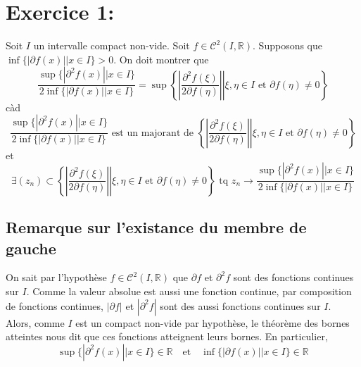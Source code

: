 \documentclass[a4paper, 12pt]{article}
\begin{document}
\newpage
\renewcommand{\contentsname}{Table des matières}
\tableofcontents

\newpage

\section{Exercice 1:}

Soit \( I \) un intervalle compact non-vide. Soit \( f \in \mathcal{C}^2(I, \mathbb{R}) \). Supposons que \( \inf\{|\partial f(x)| | x \in I\} > 0 \). On doit montrer que
$$
\frac{\sup \{ | \partial^2 f(x) || x \in I \}}{2 \inf \{ |\partial f(x)|| x \in I \}}
= \sup \left\{ \left. \left| \frac{\partial^2f(\xi)}{2\partial f(\eta)} \right| \right| \xi, \eta \in I \text{ et } \partial f(\eta) \neq 0 \right\}
$$
càd
\begin{equation}
    \label{eq:1.maj}
    \frac{\sup \{ | \partial^2 f(x) || x \in I \}}{2 \inf \{ |\partial f(x)|| x \in I \}} \text{ est un majorant de }
    \left\{ \left. \left| \frac{\partial^2f(\xi)}{2\partial f(\eta)} \right| \right| \xi, \eta \in I \text{ et } \partial f(\eta) \neq 0 \right\}
\end{equation}
et
\begin{equation}
    \label{eq:1.conv}
    \exists (z_n) \subset
    \left\{ \left. \left| \frac{\partial^2f(\xi)}{2\partial f(\eta)} \right| \right| \xi, \eta \in I \text{ et } \partial f(\eta) \neq 0 \right\}
    \text{ tq } z_n \to
    \frac{\sup \{ | \partial^2 f(x) || x \in I \}}{2 \inf \{ |\partial f(x)|| x \in I \}}
\end{equation}

\subsection{Remarque sur l'existance du membre de gauche}

On sait par l'hypothèse \( f \in \mathcal{C}^2(I, \mathbb{R}) \) que \( \partial f \) et \( \partial^2 f \) sont des fonctions continues sur \( I \). Comme la valeur absolue est aussi une fonction continue, par composition de fonctions continues, \( | \partial f | \) et \( | \partial^2 f | \) sont des aussi fonctions continues sur \( I \). \\
Alors, comme \( I \) est un compact non-vide par hypothèse, le théorème des bornes atteintes nous dit que ces fonctions atteignent leurs bornes. En particulier,
$$
\sup \{ | \partial^2 f(x) || x \in I \} \in \mathbb{R} \quad \text{et} \quad
\inf \{ |\partial f(x)|| x \in I \} \in \mathbb{R}
$$
\end{document}
